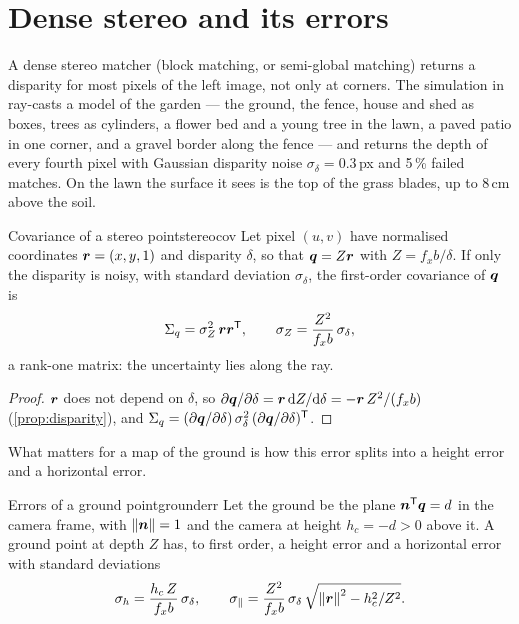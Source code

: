 \section{Dense stereo and its errors}

A dense stereo matcher (block matching, or semi-global matching) returns
a disparity for most pixels of the left image, not only at corners. The
simulation in  ray-casts a model of the garden ---
the ground, the fence, house and shed as boxes, trees as cylinders, a
flower bed and a young tree in the lawn, a paved patio in one corner,
and a gravel border along the fence --- and returns the depth of every
fourth pixel with Gaussian disparity noise $\sigma_\delta=0.3$\,px and
5\,\% failed matches. On the lawn the surface it sees is the top of the
grass blades, up to 8\,cm above the soil.

\begin{proposition}{Covariance of a stereo point}{stereocov}
Let pixel $(u,v)$ have normalised coordinates $\bm{r}=(x,y,1)$ and
disparity $\delta$, so that $\bm{q}=Z\bm{r}$ with $Z=f_xb/\delta$.
If only the disparity is noisy, with standard deviation
$\sigma_\delta$, the first-order covariance of $\bm{q}$ is
\begin{equation}\label{eq:stereocov}
\Sigma_q=\sigma_Z^2\,\bm{r}\bm{r}^{\mathsf{T}},\qquad
\sigma_Z=\frac{Z^2}{f_xb}\,\sigma_\delta ,
\end{equation}
a rank-one matrix: the uncertainty lies along the ray.
\end{proposition}

\begin{proof}
$\bm{r}$ does not depend on $\delta$, so $\partial\bm{q}/\partial
\delta=\bm{r}\,\mathrm{d}Z/\mathrm{d}\delta=-\bm{r}\,Z^2/(f_xb)$
(\cref{prop:disparity}), and $\Sigma_q=(\partial\bm{q}/\partial\delta)
\,\sigma_\delta^2\,(\partial\bm{q}/\partial\delta)^{\mathsf{T}}$.
\end{proof}

What matters for a map of the ground is how this error splits into a
height error and a horizontal error.

\begin{proposition}{Errors of a ground point}{grounderr}
Let the ground be the plane $\bm{n}^{\mathsf{T}}\bm{q}=d$ in the camera frame,
with $\left\lVert \bm{n}\right\rVert=1$ and the camera at height $h_c=-d>0$ above it.
A ground point at depth $Z$ has, to first order, a height error and a
horizontal error with standard deviations
\begin{equation}\label{eq:grounderr}
\sigma_h=\frac{h_c\,Z}{f_xb}\,\sigma_\delta,\qquad
\sigma_\parallel=\frac{Z^2}{f_xb}\,\sigma_\delta\,
\sqrt{\left\lVert \bm{r}\right\rVert^2-h_c^2/Z^2}.
\end{equation}
\end{proposition}

